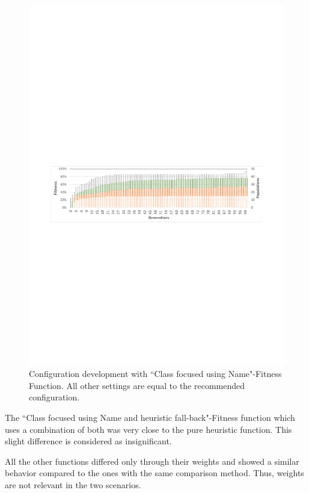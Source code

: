 \begin{figure}[!ht]
	\centering
	\includegraphics[scale=0.8, trim=1.5cm 11.5cm 1.5cm 13cm, clip=true]{Images/ConfigurationComparison_BestWithBalancedFitnessFunction.pdf} 
	\caption{Configuration development with ``Class focused using Name"-Fitness Function. All other settings are equal to the recommended configuration.}
	\label{figConfigurationComparison_BestWithBalancedFitnessFunction}
\end{figure}

The ``Class focused using Name and heuristic fall-back"-Fitness function which uses a combination of both was very close to the pure heuristic function. This slight difference is considered as insignificant.

All the other functions differed only through their weights and showed a similar behavior compared to the ones with the same comparison method. Thus, weights are not relevant in the two scenarios.

